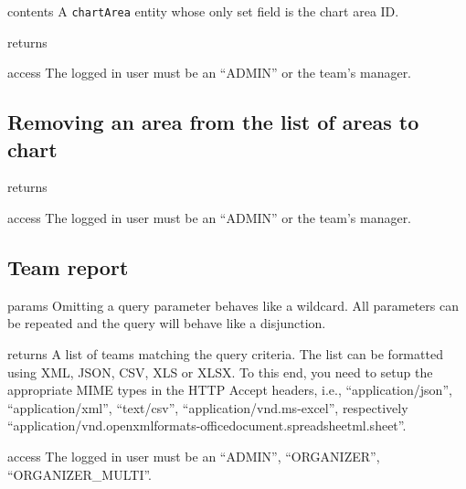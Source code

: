 \begin{apidata}{contents}
  A \texttt{chartArea} entity whose only set field is the chart area ID.
\end{apidata}
\begin{apidata}{returns}
  \begin{datalist}
  \end{datalist}
\end{apidata}
\begin{apidata}{access}
The logged in user must be an ``ADMIN'' or the team's manager.
\end{apidata}


\subsection{Removing an area from the list of areas to chart}

\begin{apidata}{returns}
  \begin{datalist}
  \end{datalist}
\end{apidata}
\begin{apidata}{access}
The logged in user must be an ``ADMIN'' or the team's manager.
\end{apidata}


\subsection{Team report}

\begin{apidata}{params}
  Omitting a query parameter behaves like a wildcard. All parameters can be
  repeated and the query will behave like a disjunction.
\end{apidata}
\begin{apidata}{returns}
  A list of teams matching the query criteria. The list can be formatted using
  XML, JSON, CSV, XLS or XLSX. To this end, you need to setup the appropriate
  MIME types in the HTTP Accept headers, i.e., ``application/json'',
  ``application/xml'', ``text/csv'', ``application/vnd.ms-excel'', respectively
  ``application/vnd.openxmlformats-officedocument.spreadsheetml.sheet''.
\end{apidata}
\begin{apidata}{access}
The logged in user must be an ``ADMIN'', ``ORGANIZER'', ``ORGANIZER\_MULTI''. 
\end{apidata}

